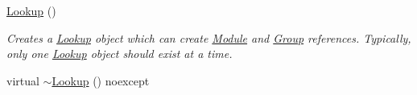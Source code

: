 \begin{DoxyCompactItemize}
\item 
\hyperlink{classhebi_1_1Lookup_acdfa87d652dd197ff578e5ea0f25128c}{Lookup} ()
\begin{DoxyCompactList}\small\item\em Creates a \hyperlink{classhebi_1_1Lookup}{Lookup} object which can create \hyperlink{classhebi_1_1Module}{Module} and \hyperlink{classhebi_1_1Group}{Group} references. Typically, only one \hyperlink{classhebi_1_1Lookup}{Lookup} object should exist at a time. \end{DoxyCompactList}\item 
virtual \hyperlink{classhebi_1_1Lookup_a7d9e38f258c85bedfd63c71c41d1bd8b}{$\sim$\+Lookup} () noexcept\hypertarget{classhebi_1_1Lookup_a7d9e38f258c85bedfd63c71c41d1bd8b}{}\label{classhebi_1_1Lookup_a7d9e38f258c85bedfd63c71c41d1bd8b}


\end{DoxyCompactItemize}
